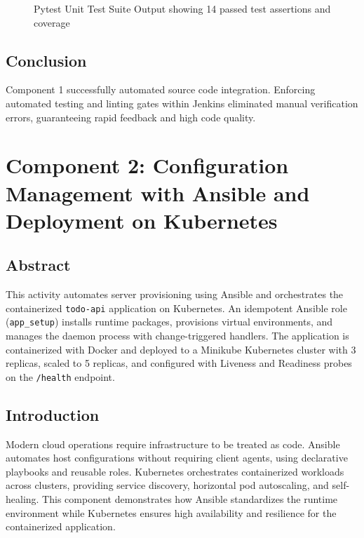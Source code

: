\documentclass[12pt,a4paper]{article}
\begin{document}
\begin{figure}[htbp]
\centering
\caption{Pytest Unit Test Suite Output showing 14 passed test assertions and coverage}
\end{figure}

\subsection*{Conclusion}
Component 1 successfully automated source code integration. Enforcing automated testing and linting gates within Jenkins eliminated manual verification errors, guaranteeing rapid feedback and high code quality.

\newpage

\section*{Component 2: Configuration Management with Ansible and Deployment on Kubernetes}

\subsection*{Abstract}
This activity automates server provisioning using Ansible and orchestrates the containerized \texttt{todo-api} application on Kubernetes. An idempotent Ansible role (\texttt{app\_setup}) installs runtime packages, provisions virtual environments, and manages the daemon process with change-triggered handlers. The application is containerized with Docker and deployed to a Minikube Kubernetes cluster with 3 replicas, scaled to 5 replicas, and configured with Liveness and Readiness probes on the \texttt{/health} endpoint.

\subsection*{Introduction}
Modern cloud operations require infrastructure to be treated as code. Ansible automates host configurations without requiring client agents, using declarative playbooks and reusable roles. Kubernetes orchestrates containerized workloads across clusters, providing service discovery, horizontal pod autoscaling, and self-healing. This component demonstrates how Ansible standardizes the runtime environment while Kubernetes ensures high availability and resilience for the containerized application.
\end{document}
